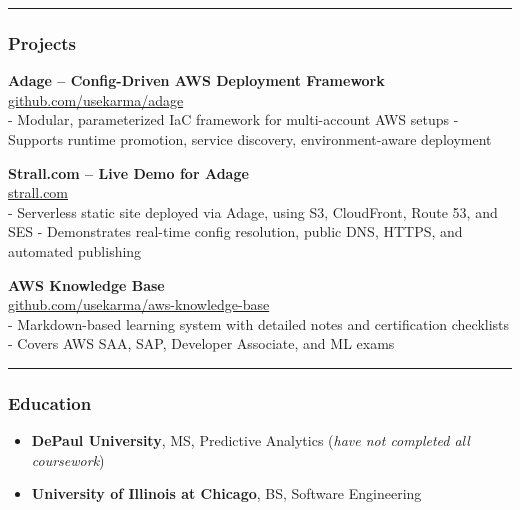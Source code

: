 \documentclass[11pt]{article}
\providecommand{\tightlist}{%
  \setlength{\itemsep}{0pt}\setlength{\parskip}{0pt}}
\begin{document}
\begin{center}\rule{0.5\linewidth}{0.5pt}\end{center}

\hypertarget{projects}{%
\subsubsection{Projects}\label{projects}}

\textbf{Adage -- Config-Driven AWS Deployment Framework}\\
\href{https://github.com/usekarma/adage}{github.com/usekarma/adage}\\
- Modular, parameterized IaC framework for multi-account AWS setups -
Supports runtime promotion, service discovery, environment-aware
deployment

\textbf{Strall.com -- Live Demo for Adage}\\
\href{https://strall.com}{strall.com}\\
- Serverless static site deployed via Adage, using S3, CloudFront, Route
53, and SES - Demonstrates real-time config resolution, public DNS,
HTTPS, and automated publishing

\textbf{AWS Knowledge Base}\\
\href{https://github.com/usekarma/aws-knowledge-base}{github.com/usekarma/aws-knowledge-base}\\
- Markdown-based learning system with detailed notes and certification
checklists - Covers AWS SAA, SAP, Developer Associate, and ML exams

\begin{center}\rule{0.5\linewidth}{0.5pt}\end{center}

\hypertarget{education}{%
\subsubsection{Education}\label{education}}

\begin{itemize}
\tightlist
\item
  \textbf{DePaul University}, MS, Predictive Analytics (\emph{have not
  completed all coursework})
\item
  \textbf{University of Illinois at Chicago}, BS, Software Engineering
\end{itemize}
\end{document}
